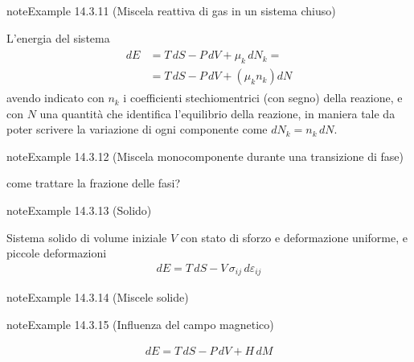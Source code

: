 \documentclass[letterpaper,10pt,italian]{jupyterBook}
\begin{document}
\begin{sphinxadmonition}{note}{Example 14.3.11 (Miscela reattiva di gas in un sistema chiuso)}



\sphinxAtStartPar
L’energia del sistema
\begin{equation*}
\begin{split}\begin{aligned}
  dE & = T \, dS - P \, dV + \mu_k \, dN_k = \\
     & = T \, dS - P \, dV + \left( \mu_k n_k \right) dN
\end{aligned}\end{split}
\end{equation*}
\sphinxAtStartPar
avendo indicato con \(n_k\) i coefficienti stechiomentrici (con segno) della reazione, e con \(N\) una quantità che identifica l’equilibrio della reazione, in maniera tale da poter scrivere la variazione di ogni componente come \(d N_k = n_k \, d N\).
\end{sphinxadmonition}
\label{ch/thermodynamics/principles-gibbs-phase-rule:example-15}
\begin{sphinxadmonition}{note}{Example 14.3.12 (Miscela monocomponente durante una transizione di fase)}



\sphinxAtStartPar
{} come trattare la frazione delle fasi?
\end{sphinxadmonition}
\label{ch/thermodynamics/principles-gibbs-phase-rule:example-16}
\begin{sphinxadmonition}{note}{Example 14.3.13 (Solido)}



\sphinxAtStartPar
Sistema solido di volume iniziale \(V\) con stato di sforzo e deformazione uniforme, e piccole deformazioni
\begin{equation*}
\begin{split}dE = T \, dS - V \, \sigma_{ij} \, d \varepsilon_{ij} \end{split}
\end{equation*}\end{sphinxadmonition}
\label{ch/thermodynamics/principles-gibbs-phase-rule:example-17}
\begin{sphinxadmonition}{note}{Example 14.3.14 (Miscele solide)}



\sphinxAtStartPar
{}
\end{sphinxadmonition}
\label{ch/thermodynamics/principles-gibbs-phase-rule:example-18}
\begin{sphinxadmonition}{note}{Example 14.3.15 (Influenza del campo magnetico)}


\begin{equation*}
\begin{split}dE = T \, dS - P \, d V + H \, dM\end{split}
\end{equation*}
\sphinxAtStartPar
{}
\end{sphinxadmonition}
\end{document}

